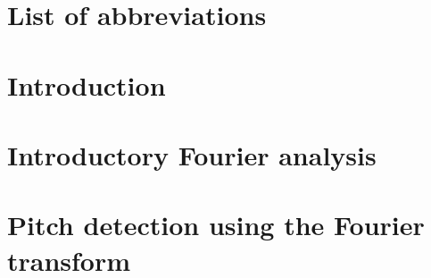 \documentclass[a4paper,12pt]{article}
\begin{document}

\renewcommand{\cftsecfont}{\fontfamily{comfortaa}\selectfont}

\renewcommand{\cftsubsecfont}{\fontfamily{comfortaa}\selectfont}
\renewcommand{\cftsubsubsecfont}{\fontfamily{comfortaa}\selectfont}
\renewcommand{\contentsname}{\fontfamily{comfortaa}\selectfont Table of Contents}






\setcounter{tocdepth}{2}
\tableofcontents    
\newpage 


\section*{List of abbreviations}

\newpage


\section{Introduction}
 
\newpage
\section{Introductory Fourier analysis}
 
\newpage


\section{Pitch detection using the Fourier transform}

\newpage
\end{document}

